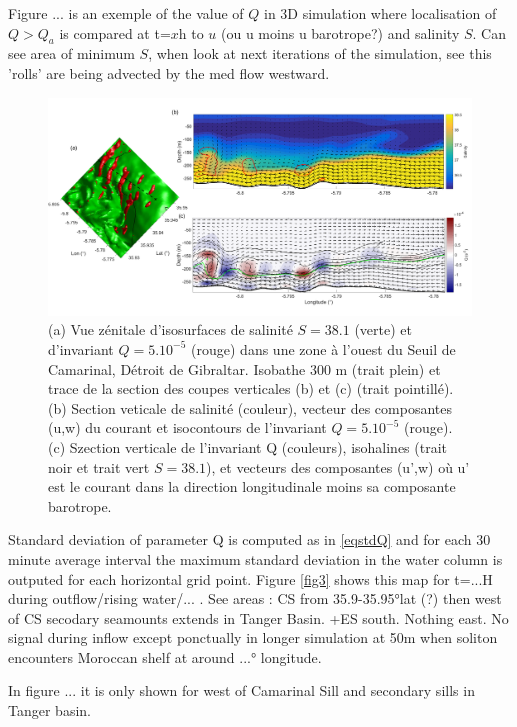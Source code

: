 Figure ... is an exemple of the value of $Q$ in 3D simulation where localisation of $Q>Q_a$ is compared at t=$x$h to $u$ (ou u moins u barotrope?) and salinity $S$. Can see area of minimum $S$, when look at next iterations of the simulation, see this 'rolls' are being advected by the med flow westward. 


\begin{figure}[!h]
 \centering
 \includegraphics[width=1\textwidth]{./GBR3D/FigInstaQ_IES4H.png}
 \caption {(a) Vue zénitale d'isosurfaces de salinité $S=38.1$ (verte) et d'invariant $Q=5.10^{-5}$ (rouge) dans une zone à l'ouest du Seuil de Camarinal, Détroit de Gibraltar. Isobathe 300 m (trait plein) et trace de la section des coupes verticales (b) et (c) (trait pointillé). (b) Section veticale de salinité (couleur), vecteur des composantes (u,w) du courant et isocontours de l'invariant $Q=5.10^{-5}$ (rouge). (c) Szection verticale de l'invariant Q (couleurs), isohalines (trait noir et trait vert $S=38.1$), et vecteurs des composantes (u',w) où u' est le courant dans la direction longitudinale moins sa composante barotrope.}
 \label{figdraftQ}
\end{figure}




Standard deviation of parameter Q is computed as in \ref{eqstdQ} and for each 30 minute average interval the maximum standard deviation in the water column is outputed for each horizontal grid point. Figure \ref{fig3} shows this map for t=...H during outflow/rising water/... . See areas : CS from 35.9-35.95°lat (?) then west of CS secodary seamounts extends in Tanger Basin. +ES south. Nothing east. No signal during inflow except ponctually in longer simulation at 50m when soliton encounters Moroccan shelf at around ...° longitude.


In figure ... it is only shown for west of Camarinal Sill and secondary sills in Tanger basin.


